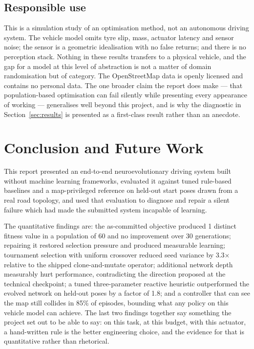 \documentclass[conference]{IEEEtran}
\begin{document}
\subsection{Responsible use}

This is a simulation study of an optimisation method, not an autonomous driving system. The vehicle model omits tyre slip, mass, actuator latency and sensor noise; the sensor is a geometric idealisation with no false returns; and there is no perception stack. Nothing in these results transfers to a physical vehicle, and the gap for a model at this level of abstraction is not a matter of domain randomisation \cite{tobin} but of category. The OpenStreetMap data is openly licensed and contains no personal data. The one broader claim the report does make — that population-based optimisation can fail silently while presenting every appearance of working — generalises well beyond this project, and is why the diagnostic in Section~\ref{sec:results} is presented as a first-class result rather than an anecdote.

\section{Conclusion and Future Work}

\label{sec:conclusion}

This report presented an end-to-end neuroevolutionary driving system built without machine learning frameworks, evaluated it against tuned rule-based baselines and a map-privileged reference on held-out start poses drawn from a real road topology, and used that evaluation to diagnose and repair a silent failure which had made the submitted system incapable of learning.

The quantitative findings are: the as-committed objective produced 1 distinct fitness value in a population of 60 and no improvement over 30 generations; repairing it restored selection pressure and produced measurable learning; tournament selection with uniform crossover reduced seed variance by 3.3× relative to the shipped clone-and-mutate operator; additional network depth measurably hurt performance, contradicting the direction proposed at the technical checkpoint; a tuned three-parameter reactive heuristic outperformed the evolved network on held-out poses by a factor of 1.8; and a controller that can see the map still collides in 85\% of episodes, bounding what any policy on this vehicle model can achieve. The last two findings together say something the project set out to be able to say: on this task, at this budget, with this actuator, a hand-written rule is the better engineering choice, and the evidence for that is quantitative rather than rhetorical.
\end{document}
